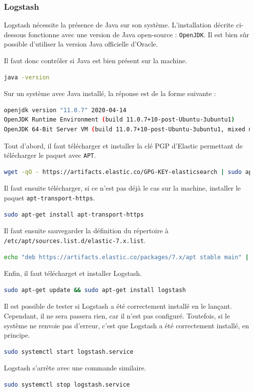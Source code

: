 \documentclass[paper=a4, fontsize=11pt]{scrartcl}
\begin{document}
\subsubsection{Logstash}
Logstash nécessite la présence de Java sur son système. L'installation décrite ci-dessous fonctionne avec une version de Java open-source : \verb,OpenJDK,. Il est bien sûr possible d'utiliser la version Java officielle d'Oracle.

Il faut donc contrôler si Java est bien présent sur la machine.
\begin{lstlisting}[language=bash]
java -version
\end{lstlisting}
Sur un système avec Java installé, la réponse est de la forme suivante :
\begin{lstlisting}[language=bash]
openjdk version "11.0.7" 2020-04-14
OpenJDK Runtime Environment (build 11.0.7+10-post-Ubuntu-3ubuntu1)
OpenJDK 64-Bit Server VM (build 11.0.7+10-post-Ubuntu-3ubuntu1, mixed mode, sharing)
\end{lstlisting}

Tout d'abord, il faut télécharger et installer la clé PGP d'Elastic permettant de télécharger le paquet avec \verb,APT,.
\begin{lstlisting}[language=bash]
wget -qO - https://artifacts.elastic.co/GPG-KEY-elasticsearch | sudo apt-key add -
\end{lstlisting}
Il faut ensuite télécharger, si ce n'est pas déjà le cas sur la machine, installer le paquet \verb,apt-transport-https,.
\begin{lstlisting}[language=bash]
sudo apt-get install apt-transport-https
\end{lstlisting}
Il faut ensuite sauvegarder la définition du répertoire à \verb,/etc/apt/sources.list.d/elastic-7.x.list,.
\begin{lstlisting}[language=bash]
echo "deb https://artifacts.elastic.co/packages/7.x/apt stable main" | sudo tee -a /etc/apt/sources.list.d/elastic-7.x.list
\end{lstlisting}
Enfin, il faut télécharget et installer Logstash.
\begin{lstlisting}[language=bash]
sudo apt-get update && sudo apt-get install logstash
\end{lstlisting}
Il est possible de tester si Logstash a été correctement installé en le lançant. Cependant, il ne sera passera rien, car il n'est pas configuré. Toutefois, si le système ne renvoie pas d'erreur, c'est que Logstash a été correctement installé, en principe.
\begin{lstlisting}[language=bash]
sudo systemctl start logstash.service
\end{lstlisting}
Logstash s'arrête avec une commande similaire.
\begin{lstlisting}[language=bash]
sudo systemctl stop logstash.service
\end{lstlisting}
\end{document}
